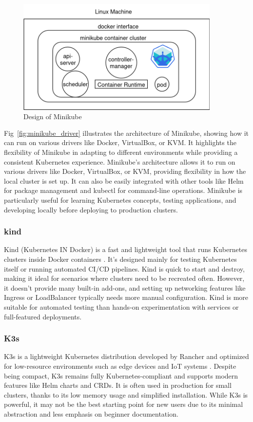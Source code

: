 \begin{figure}[H]
\caption{Design of Minikube}
\centering
\includegraphics[width=0.9\textwidth]{Design/minikube_driver.png}
\end{figure}
\label{fig:minikube_driver}
Fig~\ref{fig:minikube_driver} illustrates the architecture of Minikube, showing how it can run on various drivers like Docker, VirtualBox, or KVM. It highlights the flexibility of Minikube in adapting to different environments while providing a consistent Kubernetes experience.
Minikube's architecture allows it to run on various drivers like Docker, VirtualBox, or KVM, providing flexibility in how the local cluster is set up. It can also be easily integrated with other tools like Helm for package management and kubectl for command-line operations. Minikube is particularly useful for learning Kubernetes concepts, testing applications, and developing locally before deploying to production clusters.

\subsubsection{kind}
Kind (Kubernetes IN Docker) is a fast and lightweight tool that runs Kubernetes clusters inside Docker containers \cite{kind-docs}. It's designed mainly for testing Kubernetes itself or running automated CI/CD pipelines. Kind is quick to start and destroy, making it ideal for scenarios where clusters need to be recreated often. However, it doesn't provide many built-in add-ons, and setting up networking features like Ingress or LoadBalancer typically needs more manual configuration. Kind is more suitable for automated testing than hands-on experimentation with services or full-featured deployments.

\subsubsection{K3s}
K3s is a lightweight Kubernetes distribution developed by Rancher and optimized for low-resource environments such as edge devices and IoT systems \cite{k3s-docs}. Despite being compact, K3s remains fully Kubernetes-compliant and supports modern features like Helm charts and CRDs. It is often used in production for small clusters, thanks to its low memory usage and simplified installation. While K3s is powerful, it may not be the best starting point for new users due to its minimal abstraction and less emphasis on beginner documentation.

